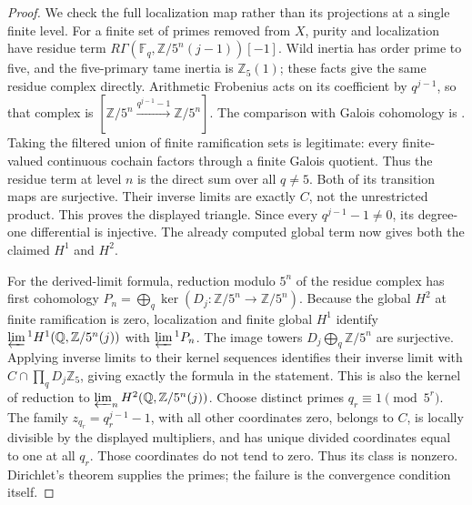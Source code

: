 \begin{proof}
We check the full localization map rather than its projections
at a single finite level. For a finite set of primes removed from
\(X\), purity and localization have residue term
\(R\Gamma(\mathbb F_q,\mathbb Z/5^n(j-1))[-1]\).
Wild inertia has order prime to five, and the five-primary tame
inertia is \(\mathbb Z_5(1)\); these facts give the same residue
complex directly. Arithmetic Frobenius acts on its coefficient
by \(q^{j-1}\), so that complex is
\([\mathbb Z/5^n\xrightarrow{q^{j-1}-1}\mathbb Z/5^n]\).
The comparison with Galois cohomology is
\cite[II, Proposition 2.9]{DE_MilneADT}. Taking the filtered union
of finite ramification sets is legitimate: every finite-valued
continuous cochain factors through a finite Galois quotient.
Thus the residue term at level \(n\) is the direct sum over all
\(q\ne5\). Both of its transition maps are surjective. Their
inverse limits are exactly \(C\), not the unrestricted product.
This proves the displayed triangle. Since every
\(q^{j-1}-1\ne0\), its degree-one differential is injective.
The already computed global term now gives both the claimed
\(H^1\) and \(H^2\).

For the derived-limit formula, reduction modulo \(5^n\) of the
residue complex has first cohomology
\(P_n=\bigoplus_q\ker(D_j:\mathbb Z/5^n\to\mathbb Z/5^n)\).
Because the global \(H^2\) at finite ramification is zero,
localization and finite global \(H^1\) identify
\(\varprojlim{}^1H^1(\mathbb Q,\mathbb Z/5^n(j))\) with
\(\varprojlim{}^1P_n\). The image towers
\(D_j\bigoplus_q\mathbb Z/5^n\) are surjective. Applying inverse
limits to their kernel sequences identifies their inverse limit
with \(C\cap\prod_q D_j\mathbb Z_5\), giving exactly the formula
in the statement. This is also the kernel of reduction to
\(\varprojlim_nH^2(\mathbb Q,\mathbb Z/5^n(j))\).
Choose distinct primes \(q_r\equiv1\pmod{5^r}\). The family
\(z_{q_r}=q_r^{j-1}-1\), with all other coordinates zero,
belongs to \(C\), is locally divisible by the displayed
multipliers, and has unique divided coordinates equal to one
at all \(q_r\). Those coordinates do not tend to zero.
Thus its class is nonzero. Dirichlet's theorem supplies the
primes; the failure is the convergence condition itself.
\end{proof}



